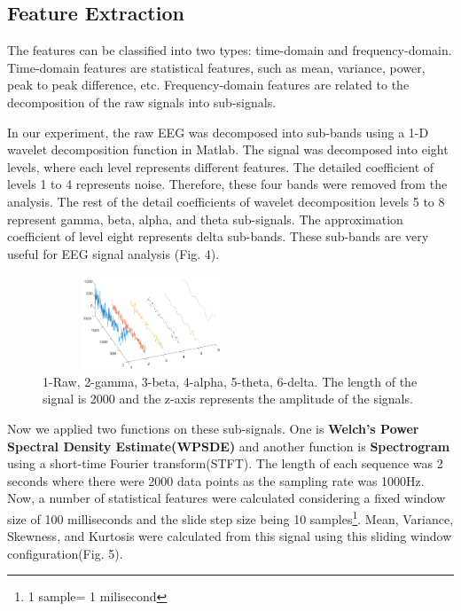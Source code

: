 \documentclass[conference]{IEEEtran}
\begin{document}
\subsection{Feature Extraction}\label{fe}
The features can be classified into two types: time-domain and frequency-domain.  Time-domain features are statistical features, such as mean, variance, power, peak to peak difference, etc. Frequency-domain features are related to the decomposition of the raw signals into sub-signals.

In our experiment, the raw EEG was decomposed into sub-bands using a 1-D wavelet decomposition function in Matlab.  The signal was decomposed into eight levels, where each level represents different features. The detailed coefficient of levels 1 to 4 represents noise. Therefore, these four bands were removed from the analysis. The rest of the detail coefficients of wavelet decomposition levels 5 to 8 represent gamma, beta, alpha, and theta sub-signals. The approximation coefficient of level eight represents delta sub-bands. These sub-bands are very useful for EEG signal analysis (Fig. 4).

\begin{figure}[htbp]
\centerline{\includegraphics[height= 2.8cm, width = 6.5cm]{figures/data_pre.png}}
\caption{1-Raw, 2-gamma, 3-beta, 4-alpha, 5-theta, 6-delta. The length of the signal is 2000 and the z-axis represents the amplitude of the signals.}
\label{fig}
\end{figure}

Now we applied two functions on these sub-signals. One is \textbf{Welch’s Power Spectral Density Estimate(WPSDE)} and another function is \textbf{Spectrogram} using a short-time Fourier transform(STFT). The length of each sequence was 2 seconds where there were 2000 data points as the sampling rate was 1000Hz. Now, a number of statistical features were calculated considering a fixed window size of 100 milliseconds and the slide step size being 10 samples\footnote{1 sample= 1 milisecond}. Mean, Variance, Skewness, and Kurtosis were calculated from this signal using this sliding window configuration(Fig. 5). 
\end{document}

